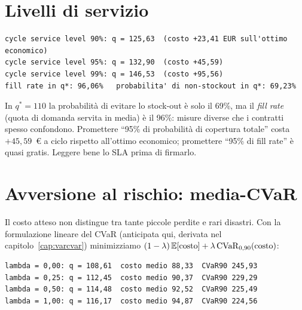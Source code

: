 \section{Livelli di servizio}

\begin{lstlisting}[style=output]
cycle service level 90%: q = 125,63  (costo +23,41 EUR sull'ottimo economico)
cycle service level 95%: q = 132,90  (costo +45,59)
cycle service level 99%: q = 146,53  (costo +95,56)
fill rate in q*: 96,06%   probabilita' di non-stockout in q*: 69,23%
\end{lstlisting}

\begin{attenzione}
In $q^* = 110$ la probabilità di evitare lo stock-out è solo il 69\%, ma il
\emph{fill rate} (quota di domanda servita in media) è il 96\%: misure diverse che i
contratti spesso confondono. Promettere ``95\% di probabilità di copertura totale''
costa $+45{,}59$~\euro{} a ciclo rispetto all'ottimo economico; promettere ``95\% di
fill rate'' è quasi gratis. Leggere bene lo SLA prima di firmarlo.
\end{attenzione}

\section{Avversione al rischio: media-CVaR}

Il costo atteso non distingue tra tante piccole perdite e rari disastri. Con la
formulazione lineare del CVaR (anticipata qui, derivata nel
capitolo~\ref{cap:varcvar}) minimizziamo
$(1-\lambda)\,\mathbb{E}[\text{costo}] + \lambda\, \mathrm{CVaR}_{0,90}(\text{costo})$:

\begin{lstlisting}[style=output]
lambda = 0,00: q = 108,61  costo medio 88,33  CVaR90 245,93
lambda = 0,25: q = 112,45  costo medio 90,37  CVaR90 229,29
lambda = 0,50: q = 114,48  costo medio 92,52  CVaR90 225,49
lambda = 1,00: q = 116,17  costo medio 94,87  CVaR90 224,56
\end{lstlisting}

\begin{center}
\end{center}

